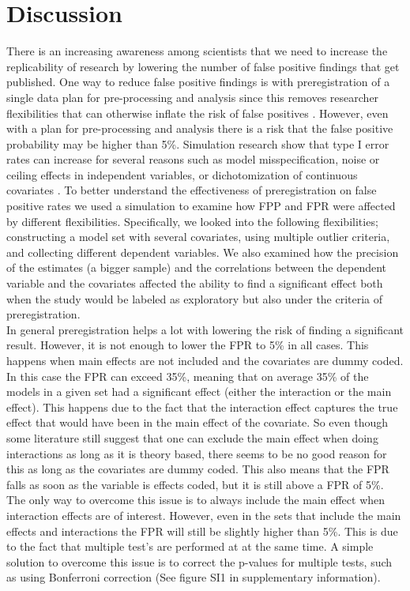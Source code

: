\section{Discussion}
There is an increasing awareness among scientists that we need to increase the replicability of research by lowering the number of false positive findings that get published. One way to reduce false positive findings is with preregistration of a single data plan for pre-processing and analysis since this removes researcher flexibilities that can otherwise inflate the risk of false positives \citep{Simmons2011}. However, even with a plan for pre-processing and analysis there is a risk that the false positive probability may be higher than 5\%. Simulation research show that type I error rates can increase for several reasons such as model misspecification, noise or ceiling effects in independent variables, or dichotomization of continuous covariates \citep{Dennis2019, Litiere2007, Brunner2009, Austin2003, Austin2004}. To better understand the effectiveness of preregistration on false positive rates we used a simulation to examine how FPP and FPR were affected by different flexibilities. Specifically, we looked into the following flexibilities; constructing a model set with several covariates, using multiple outlier criteria, and collecting different dependent variables. We also examined how the precision of the estimates (a bigger sample) and the correlations between the dependent variable and the covariates affected the ability to find a significant effect both when the study would be labeled as exploratory but also under the criteria of preregistration. \\

In general preregistration helps a lot with lowering the risk of finding a significant result. However, it is not enough to lower the FPR to 5\%  in all cases. This happens when main effects are not included and the covariates are dummy coded. In this case the FPR can exceed 35\%, meaning that on average 35\% of the models in a given set had a significant effect (either the interaction or the main effect). This happens due to the fact that the interaction effect captures the true effect that would have been in the main effect of the covariate. So even though some literature still suggest that one can exclude the main effect when doing interactions as long as it is theory based, there seems to be no good reason for this as long as the covariates are dummy coded. This also means that the FPR falls as soon as the variable is effects coded, but it is still above a FPR of 5\%. The only way to overcome this issue is to always include the main effect when interaction effects are of interest. However, even in the sets that include the main effects and interactions the FPR will still be slightly higher than 5\%. This is due to the fact that multiple test's are performed at at the same time. A simple solution to overcome this issue is to correct the p-values for multiple tests, such as using Bonferroni correction \citep{dunn1961multiple} (See figure SI1 in supplementary information).  \\

